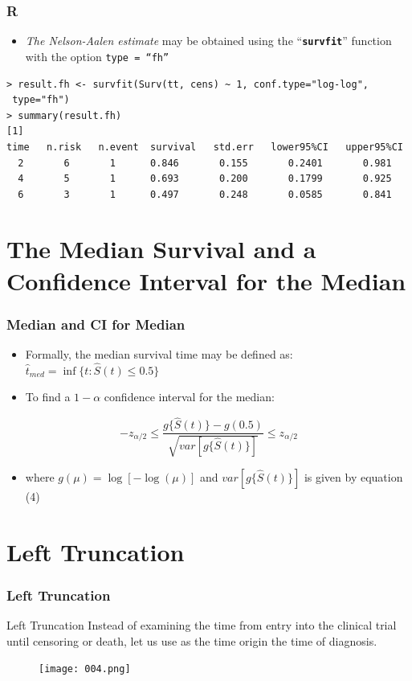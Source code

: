 \documentclass{beamer}
\newcommand{\empr}[1]{{\emph{\color{red}#1}}}
\newcommand{\pkg}[1]{{\textbf{\texttt{#1}}}}
\begin{document}
\pagebreak
\begin{frame}[fragile]
\frametitle{R}
\begin{itemize}
\item \empr{The Nelson-Aalen estimate} may be obtained using the ``\pkg{survfit}'' function with the option \texttt{type = ``fh''}
\end{itemize}
\begin{Verbatim}
> result.fh <- survfit(Surv(tt, cens) ~ 1, conf.type="log-log",
 type="fh")
> summary(result.fh)
[1]
time   n.risk   n.event  survival   std.err   lower95%CI   upper95%CI
  2       6       1      0.846       0.155       0.2401       0.981
  4       5       1      0.693       0.200       0.1799       0.925
  6       3       1      0.497       0.248       0.0585       0.841
\end{Verbatim}
\end{frame}

\section{The Median Survival and a Confidence Interval for the Median}
\begin{frame}
\frametitle{Median and CI for Median}
\begin{itemize}
\item Formally, the median survival time may be defined as:
 ${\hat{t}}_{med} = \inf \lbrace t : \hat{S}(t)\le 0.5\rbrace $
\end{itemize}
\begin{itemize}
\item To find a $1-\alpha$ confidence interval for the median:
\end{itemize}
\begin{equation}
-z_{\alpha/2} \le \frac{g\lbrace\hat{S}(t)\rbrace-g(0.5)}{\sqrt{var[g\lbrace\hat{S}(t)\rbrace]}}\le z_{\alpha/2}
\end{equation}

\begin{itemize}
\item where $g(\mu)=\log[-\log(\mu)]$ and $var[g\lbrace\hat{S}(t)\rbrace]$ is given by equation (4)
\end{itemize}
\end{frame}

\section{Left Truncation}
\begin{frame}
\frametitle{Left Truncation}

\begin{defblock}{Left Truncation}
Instead of examining the time from {\color{red}entry} into the clinical trial until {\color{red}censoring or death}, let us use as the time origin the time of {\color{red}diagnosis}.
\end{defblock}

\begin{figure}[h!]
	\texttt{[image: 004.png]}
\end{figure}
\end{frame}
\end{document}
